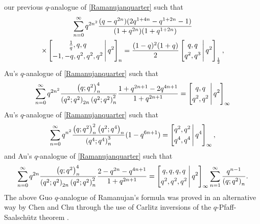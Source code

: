 \documentclass[12pt]{article}
\begin{document}
 our previous $q$-analogue of \eqref{Ramanujanquarter} 
 \cite{Campbell2026} such that
\begin{multline*}
 \sum_{n=0}^{\infty} 
 q^{2 n^2} \frac{ (q - q^{2n}) (2q^{1+4n} - q^{1+2n} - 1 ) }{ (1+q^{2n}) (1 + q^{1+2n}) } \\
 \times \left[ \begin{matrix} \frac{1}{q}, q, q \vspace{1mm} \\ 
 -1, -q, q^2, q^2, q^2 \end{matrix} \, \Bigg| \, q^2 \right]_{n} 
 = 
 \frac{(1-q)^2 (1+q) }{2} \left[ \begin{matrix} q, q \vspace{1mm} \\ 
 q^2, q^3 \end{matrix} \, \Bigg| \, q^2 \right]_{\frac{1}{2}}, 
\end{multline*}
 Au's $q$-analogue of \eqref{Ramanujanquarter}
 such that 
$$ \sum_{n=0}^{\infty} 
 q^{2n^2} \frac{ \left( q;q^2 \right)_{n}^{4} }{ \left( q^2;q^2 \right)_{2n} 
 \left( q^2;q^2 \right)_{n}^{2} } \frac{1+q^{2n+1}-2q^{4n+1}}{1+q^{2n+1}} 
 = \left[ \begin{matrix} q, q \vspace{1mm} \\ 
 q^2, q^2 \end{matrix} \, \Bigg| \, q^2 \right]_{\infty} $$
 Au's $q$-analogue of \eqref{Ramanujanquarter}
 such that 
$$ \sum_{n=0}^{\infty} 
 q^{ n^2} \frac{ \left( q;q^2 \right)_{n}^{2} \left( q^2;q^4 \right)_{n} }{ 
 \left( q^4;q^4 \right)_{n}^{3} } (1-q^{6n+1}) 
 = \left[ \begin{matrix} q^2, q^2 \vspace{1mm} \\ 
 q^4, q^4 \end{matrix} \, \Bigg| \, q^4 \right]_{\infty}, $$
 and Au's $q$-analogue of \eqref{Ramanujanquarter}
 such that 
$$ \sum_{n=0}^{\infty} 
 q^{ 2 n} \frac{ \left( q;q^2 \right)_{n}^{4} }{ 
 \left( q^2;q^2 \right)_{2n} \left( q^2;q^2 \right)_{n}^{2} } \frac{2-q^{2n} - q^{4n+1}}{1+q^{2n+1}} 
 = \left[ \begin{matrix} q, q, q, q \vspace{1mm} \\ 
 q^2, q^2, q^2 \end{matrix} \, \Bigg| \, q^2 \right]_{\infty} \sum_{n=1}^{\infty} \frac{q^{n-1}}{ \left( q;q^2 \right)_{n} }. $$
 The above Guo $q$-analogue of Ramanujan's formula was proved in an alternative way by Chen and Chu 
 through the use of Carlitz inversions of
 the $q$-Pfaff-Saalsch\"{u}tz theorem \cite{ChenChu2023}. 
\end{document}
